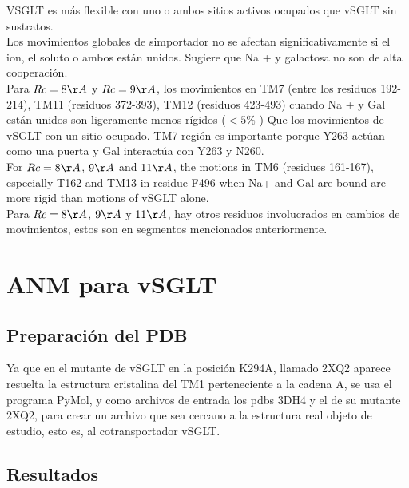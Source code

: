  VSGLT es m\'{a}s flexible con uno o ambos sitios activos ocupados que vSGLT sin sustratos.\\
Los movimientos globales de simportador no se afectan significativamente si el ion, el soluto o ambos est\'{a}n unidos. Sugiere que Na + y galactosa no son de alta cooperaci\'{o}n.\\
Para $Rc = 8\AA$ y $Rc = 9\AA$, los movimientos en TM7 (entre los residuos 192-214), TM11 (residuos 372-393), TM12 (residuos 423-493) cuando Na + y Gal est\'{a}n unidos son ligeramente menos r\'{i}gidos ($<5\%$ ) Que los movimientos de vSGLT con un sitio ocupado. TM7 regi\'{o}n es importante porque Y263 act\'{u}an como una puerta y Gal interact\'{u}a con Y263 y N260.\\
For $Rc=8\AA$,  $9\AA$ and $11\AA$, the motions in TM6 (residues 161-167), especially T162 and TM13 in residue F496  when Na+ and Gal are bound are more rigid than  motions of vSGLT alone.\\
Para $Rc = 8\AA$, $9\AA$ y $11\AA$, hay otros residuos involucrados en cambios de movimientos, estos son en segmentos mencionados anteriormente.\\

\section{ANM para vSGLT}
\subsection{Preparaci\'{o}n del PDB}
Ya que en el mutante de vSGLT en la posici\'{o}n K294A, llamado 2XQ2 aparece resuelta la estructura cristalina del TM1 perteneciente a la cadena A, se usa el programa PyMol, y como archivos de entrada los pdbs 3DH4 y el de su mutante 2XQ2, para crear un archivo que sea cercano a la estructura real objeto de estudio, esto es, al cotransportador vSGLT. 
\subsection{Resultados}

